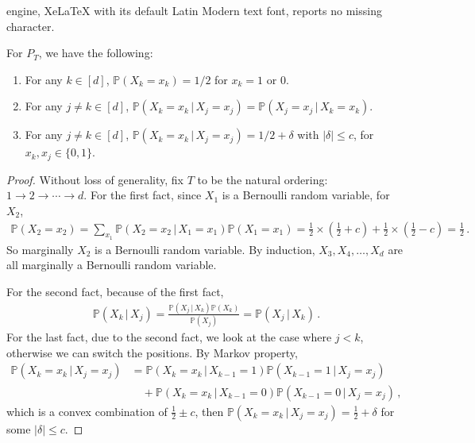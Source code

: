 \documentclass[10pt,a4paper]{amsart}
\newcommand{\dd}{d}
\newcommand{\given}{\,|\,}
\newcommand{\prob}{\mathbb{P}}
\begin{document}
engine, XeLaTeX with its default Latin Modern text font, reports no missing character.
\begin{lemma}\label{lem:bern:lb:fact}
For $P_{T}$, we have the following:
\begin{enumerate}
    \item For any $k\in[\dd]$, $\prob(X_k=x_k)=1/2$ for $x_k=1$ or $0$.
    \item For any $j\ne k\in[\dd]$, $\prob(X_k=x_k\given X_j=x_j)=\prob(X_j=x_j\given X_k=x_k)$.
    \item For any $j\ne k\in[\dd]$, $\prob(X_k=x_k\given X_j=x_j) = 1/2 + \delta$ with $|\delta|\le c$, for $x_k,x_j\in \{0,1\}$.
\end{enumerate}  
\end{lemma}

\begin{proof}
Without loss of generality, fix $T$ to be the natural ordering: $1\to 2\to \cdots \to \dd$. For the first fact, since $X_1$ is a Bernoulli random variable, for $X_2$, 
\begin{align*}
    \prob(X_2 = x_2) = \sum_{x_1}\prob(X_2 = x_2 \given X_1 = x_1)\prob(X_1=x_1) = \frac{1}{2} \times (\frac{1}{2} + c) + \frac{1}{2} \times (\frac{1}{2} - c) = \frac{1}{2} \,.
\end{align*}
So marginally $X_2$ is a Bernoulli random variable. By induction, $X_3, X_4,\ldots, X_d$ are all marginally a Bernoulli random variable.

For the second fact, because of the first fact,
\begin{align*}
    \prob(X_k\given X_j) = \frac{\prob(X_j\given X_k)\prob(X_k)}{\prob(X_j)} =\prob(X_j\given X_k) \,.
\end{align*}
For the last fact, due to the second fact, we look at the case where $j < k$, otherwise we can switch the positions. By Markov property,
\begin{align*}
    \prob(X_k=x_k\given X_j=x_j) 
    &=\prob(X_k=x_k\given X_{k-1}=1) \prob(X_{k-1}=1\given X_{j}=x_{j}) \\
    &\quad + \prob(X_k=x_k\given X_{k-1}=0)\prob(X_{k-1}=0\given X_{j}=x_{j}) \,,
\end{align*}
which is a convex combination of $\frac{1}{2}\pm c$, then $\prob(X_k=x_k\given X_j=x_j) = \frac{1}{2} + \delta $ for some $|\delta|\le c$.
\end{proof}
\end{document}
